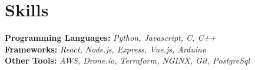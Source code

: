 \documentclass[letterpaper,12pt]{article} %
\begin{document}
\section{Skills}
\begin{itemize}[leftmargin=0.15in, label={}]
  \small{\item{
        \textbf{Programming Languages: }{\emph{Python, Javascript, C, C++}} \\
        \textbf{Frameworks: }{\emph{React, Node.js, Express, Vue.js, Arduino}}\\
        \textbf{Other Tools: }{\emph{AWS, Drone.io, Terraform, NGINX, Git, PostgreSql}} \\
        }}
\end{itemize}

\end{document}
